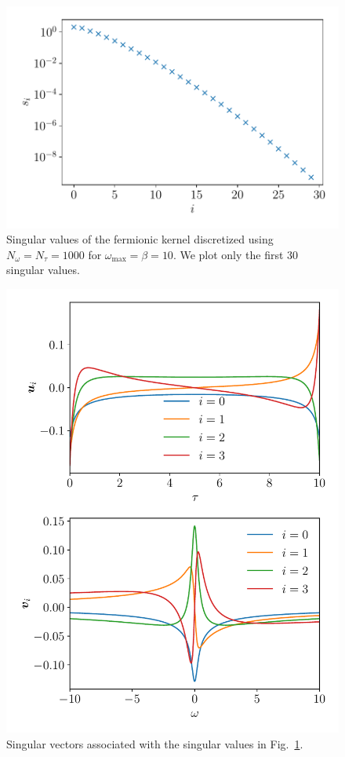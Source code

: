 \documentclass[submission, LectureNotes]{SciPost}
\newcommand{\wmax}{\ensuremath{{\omega_\mathrm{max}}}}
\begin{document}
\begin{figure}
    \centering
    \includegraphics[width=0.6\columnwidth]{kf_singular_vals.pdf}
    \caption{
    Singular values of the fermionic kernel discretized using $N_\omega=N_\tau=1000$ for $\wmax=\beta=10$.
    We plot only the first 30 singular values.
    }
    \label{fig:kf-singular-vals}
\end{figure}

\begin{figure}
    \centering
    \includegraphics[width=0.6\columnwidth]{kf_singular_vectors.pdf}
    \caption{
        Singular vectors associated with the singular values in Fig.~\ref{fig:kf-singular-vals}.
    }
    \label{fig:kf-singular-vectors}
\end{figure}
\end{document}
